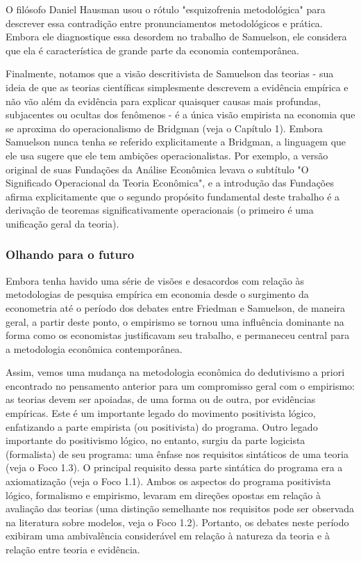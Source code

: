 \documentclass[12pt]{article}
\begin{document}
O filósofo Daniel Hausman usou o rótulo "esquizofrenia metodológica" para descrever essa contradição entre pronunciamentos metodológicos e prática. Embora ele diagnostique essa desordem no trabalho de Samuelson, ele considera que ela é característica de grande parte da economia contemporânea.

Finalmente, notamos que a visão descritivista de Samuelson das teorias - sua ideia de que as teorias científicas simplesmente descrevem a evidência empírica e não vão além da evidência para explicar quaisquer causas mais profundas, subjacentes ou ocultas dos fenômenos - é a única visão empirista na economia que se aproxima do operacionalismo de Bridgman (veja o Capítulo 1). Embora Samuelson nunca tenha se referido explicitamente a Bridgman, a linguagem que ele usa sugere que ele tem ambições operacionalistas. Por exemplo, a versão original de suas Fundações da Análise Econômica levava o subtítulo "O Significado Operacional da Teoria Econômica", e a introdução das Fundações afirma explicitamente que o segundo propósito fundamental deste trabalho é a derivação de teoremas significativamente operacionais (o primeiro é uma unificação geral da teoria).

\subsubsection{\textbf{Olhando para o futuro}}
Embora tenha havido uma série de visões e desacordos com relação às metodologias de pesquisa empírica em economia desde o surgimento da econometria até o período dos debates entre Friedman e Samuelson, de maneira geral, a partir deste ponto, o empirismo se tornou uma influência dominante na forma como os economistas justificavam seu trabalho, e permaneceu central para a metodologia econômica contemporânea.

Assim, vemos uma mudança na metodologia econômica do dedutivismo a priori encontrado no pensamento anterior para um compromisso geral com o empirismo: as teorias devem ser apoiadas, de uma forma ou de outra, por evidências empíricas. Este é um importante legado do movimento positivista lógico, enfatizando a parte empirista (ou positivista) do programa. Outro legado importante do positivismo lógico, no entanto, surgiu da parte logicista (formalista) de seu programa: uma ênfase nos requisitos sintáticos de uma teoria (veja o Foco 1.3). O principal requisito dessa parte sintática do programa era a axiomatização (veja o Foco 1.1). Ambos os aspectos do programa positivista lógico, formalismo e empirismo, levaram em direções opostas em relação à avaliação das teorias (uma distinção semelhante nos requisitos pode ser observada na literatura sobre modelos, veja o Foco 1.2). Portanto, os debates neste período exibiram uma ambivalência considerável em relação à natureza da teoria e à relação entre teoria e evidência.
\end{document}
